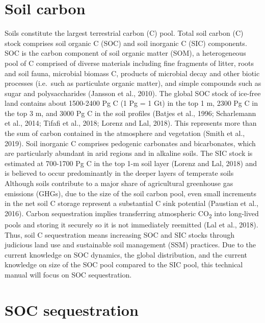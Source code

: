 \documentclass[
  10pt,
  b5paper,
]{book}
\begin{document}
\hypertarget{soil-carbon}{%
\section{Soil carbon}\label{soil-carbon}}

Soils constitute the largest terrestrial carbon (C) pool. Total soil carbon (C) stock comprises soil organic C (SOC) and soil inorganic C (SIC) components. SOC is the carbon component of soil organic matter (SOM), a heterogeneous pool of C comprised of diverse materials including fine fragments of litter, roots and soil fauna, microbial biomass C, products of microbial decay and other biotic processes (i.e.~such as particulate organic matter), and simple compounds such as sugar and polysaccharides (Jansson et al., 2010). The global SOC stock of ice-free land contains about 1500-2400 Pg C (1 Pg = 1 Gt) in the top 1 m, 2300 Pg C in the top 3 m, and 3000 Pg C in the soil profiles (Batjes et al., 1996; Scharlemann et al., 2014; Tifafi et al., 2018; Lorenz and Lal, 2018). This represents more than the sum of carbon contained in the atmosphere and vegetation (Smith et al., 2019). Soil inorganic C comprises pedogenic carbonates and bicarbonates, which are particularly abundant in arid regions and in alkaline soils. The SIC stock is estimated at 700-1700 Pg C in the top 1-m soil layer (Lorenz and Lal, 2018) and is believed to occur predominantly in the deeper layers of temperate soils
Although soils contribute to a major share of agricultural greenhouse gas emissions (GHGs), due to the size of the soil carbon pool, even small increments in the net soil C storage represent a substantial C sink potential (Paustian et al., 2016). Carbon sequestration implies transferring atmospheric CO\textsubscript{2} into long-lived pools and storing it securely so it is not immediately reemitted (Lal et al., 2018). Thus, soil C sequestration means increasing SOC and SIC stocks through judicious land use and sustainable soil management (SSM) practices. Due to the current knowledge on SOC dynamics, the global distribution, and the current knowledge on size of the SOC pool compared to the SIC pool, this technical manual will focus on SOC sequestration.

\hypertarget{soc-sequestration}{%
\section{SOC sequestration}\label{soc-sequestration}}
\end{document}
